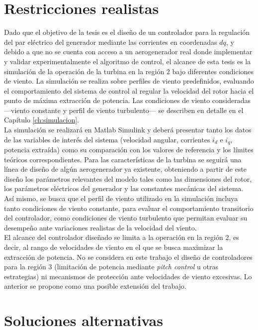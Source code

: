 \section{Restricciones realistas}\label{sec:restricciones}

Dado que el objetivo de la tesis es el diseño de un controlador para la regulación 
del par eléctrico del generador mediante las corrientes en coordenadas $dq$, y 
debido a que no se cuenta con acceso a un aerogenerador real donde implementar 
y validar experimentalmente el algoritmo de control, el alcance de esta tesis 
es la simulación de la operación de la turbina en la región 2 bajo diferentes 
condiciones de viento. La simulación se realiza sobre perfiles de viento 
predefinidos, evaluando el comportamiento del sistema de control al regular 
la velocidad del rotor hacia el punto de máxima extracción de potencia. Las 
condiciones de viento consideradas ---viento constante y perfil de viento 
turbulento--- se describen en detalle en el Capítulo \ref{ch:simulacion}.
\\

La simulación se realizará en Matlab Simulink y deberá presentar tanto los datos 
de las variables de interés del sistema (velocidad angular, corrientes $i_d$ e $i_q$, 
potencia extraída) como su comparación con los valores de referencia y los límites 
teóricos correspondientes. Para las características de la turbina se seguirá una 
línea de diseño de algún aerogenerador ya existente, obteniendo a partir de este 
diseño los parámetros relevantes del modelo tales como las dimensiones del rotor, 
los parámetros eléctricos del generador y las constantes mecánicas del sistema. 
Así mismo, se busca que el perfil de viento utilizado en la simulación incluya 
tanto condiciones de viento constante, para evaluar el comportamiento transitorio 
del controlador, como condiciones de viento turbulento que permitan evaluar su 
desempeño ante variaciones realistas de la velocidad del viento.
\\

El alcance del controlador diseñado se limita a la operación en la región 2, es 
decir, al rango de velocidades de viento en el que se busca maximizar la extracción 
de potencia. No se considera en este trabajo el diseño de controladores para la 
región 3 (limitación de potencia mediante \emph{pitch control} u otras estrategias) 
ni mecanismos de protección ante velocidades de viento excesivas. Lo anterior se 
propone como una posible extensión del trabajo.

\section{Soluciones alternativas}\label{sec:soluciones_alternativas}


